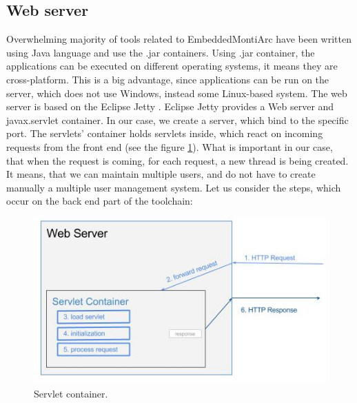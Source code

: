 \subsection{Web server}
Overwhelming majority of tools related to EmbeddedMontiArc have been written using Java language and use the .jar containers. Using .jar container, the applications can be executed on different operating systems, it means they are cross-platform. This is a big advantage, since applications can be run on the server, which does not use Windows, instead some Linux-based system. The web server is based on the Eclipse Jetty \cite{Jetty}. Eclipse Jetty provides a Web server and javax.servlet container. In our case, we create a server, which bind to the specific port. The servlets' container holds servlets inside, which react on incoming requests from the front end (see the figure \ref{fig:servlet}). \newline
What is important in our case, that when the request is coming, for each request, a new thread is being created. It means, that we can maintain multiple users, and do not have to create manually a multiple user management system. Let us consider the steps, which occur on the back end part of the toolchain:
\begin{figure}[h!]
    \centering
    \includegraphics[width=0.6\linewidth]{src/pic/servlet-container-life-cycle}
    \caption{Servlet container.}
    \label{fig:servlet}
\end{figure}
